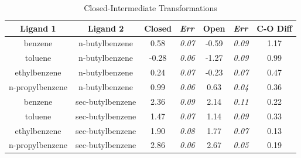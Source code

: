\documentclass[journal=jctcce,manuscript=article]{achemso}
\begin{document}
\begin{table}[!htb]
\centering
\caption{Closed-Intermediate Transformations}
\label{tbl:C-I}
\begin{tabular}{|c|c|c|l|c|l|c|}
\hline
\textbf{Ligand 1}                       & \textbf{Ligand 2}                        & {\color[HTML]{800080} \textbf{Closed}} & {\color[HTML]{800080} \textit{Err}} & {\color[HTML]{008000} \textbf{Open}} & {\color[HTML]{008000} \textit{Err}} & \textbf{C-O Diff}            \\ \hline
\cellcolor[HTML]{800080}benzene         & \cellcolor[HTML]{00FFFF}n-butylbenzene   & 0.58                                   & \textit{0.07}                       & -0.59                                & \textit{0.09}                       & \cellcolor[HTML]{FFCCC9}1.17 \\ \hline
\cellcolor[HTML]{800080}toluene         & \cellcolor[HTML]{00FFFF}n-butylbenzene   & -0.28                                  & \textit{0.06}                       & -1.27                                & \textit{0.09}                       & \cellcolor[HTML]{9AFF99}0.99 \\ \hline
\cellcolor[HTML]{800080}ethylbenzene    & \cellcolor[HTML]{00FFFF}n-butylbenzene   & 0.24                                   & \textit{0.07}                       & -0.23                                & \textit{0.07}                       & \cellcolor[HTML]{9AFF99}0.47 \\ \hline
\cellcolor[HTML]{800080}n-propylbenzene & \cellcolor[HTML]{00FFFF}n-butylbenzene   & 0.99                                   & \textit{0.06}                       & 0.63                                 & \textit{0.04}                       & \cellcolor[HTML]{9AFF99}0.36 \\ \hline
\cellcolor[HTML]{800080}benzene         & \cellcolor[HTML]{00FFFF}sec-butylbenzene & 2.36                                   & \textit{0.09}                       & 2.14                                 & \textit{0.11}                       & \cellcolor[HTML]{9AFF99}0.22 \\ \hline
\cellcolor[HTML]{800080}toluene         & \cellcolor[HTML]{00FFFF}sec-butylbenzene & 1.47                                   & \textit{0.07}                       & 1.14                                 & \textit{0.09}                       & \cellcolor[HTML]{9AFF99}0.33 \\ \hline
\cellcolor[HTML]{800080}ethylbenzene    & \cellcolor[HTML]{00FFFF}sec-butylbenzene & 1.90                                   & \textit{0.08}                       & 1.77                                 & \textit{0.07}                       & \cellcolor[HTML]{9AFF99}0.13 \\ \hline
\cellcolor[HTML]{800080}n-propylbenzene & \cellcolor[HTML]{00FFFF}sec-butylbenzene & 2.86                                   & \textit{0.06}                       & 2.67                                 & \textit{0.05}                       & \cellcolor[HTML]{9AFF99}0.19 \\ \hline
\end{tabular}
\end{table}
\end{document}
